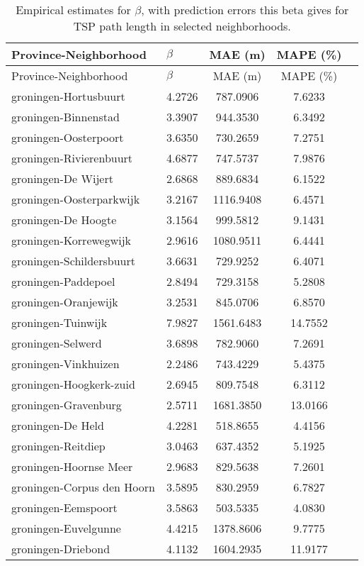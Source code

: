\begin{longtable}{llccc}
\caption{Empirical estimates for $\beta$, with prediction errors this beta gives for TSP path length in selected neighborhoods.} \label{tab:results}\\
\hline
Province-Neighborhood & $\beta$ & MAE (m) & MAPE (\%) \\
\hline
\endfirsthead
\hline
Province-Neighborhood & $\beta$ & MAE (m) & MAPE (\%) \\
\hline
\endhead
groningen-Hortusbuurt & 4.2726 & 787.0906 & 7.6233 \\
groningen-Binnenstad & 3.3907 & 944.3530 & 6.3492 \\
groningen-Oosterpoort & 3.6350 & 730.2659 & 7.2751 \\
groningen-Rivierenbuurt & 4.6877 & 747.5737 & 7.9876 \\
groningen-De Wijert & 2.6868 & 889.6834 & 6.1522 \\
groningen-Oosterparkwijk & 3.2167 & 1116.9408 & 6.4571 \\
groningen-De Hoogte & 3.1564 & 999.5812 & 9.1431 \\
groningen-Korrewegwijk & 2.9616 & 1080.9511 & 6.4441 \\
groningen-Schildersbuurt & 3.6631 & 729.9252 & 6.4071 \\
groningen-Paddepoel & 2.8494 & 729.3158 & 5.2808 \\
groningen-Oranjewijk & 3.2531 & 845.0706 & 6.8570 \\
groningen-Tuinwijk & 7.9827 & 1561.6483 & 14.7552 \\
groningen-Selwerd & 3.6898 & 782.9060 & 7.2691 \\
groningen-Vinkhuizen & 2.2486 & 743.4229 & 5.4375 \\
groningen-Hoogkerk-zuid & 2.6945 & 809.7548 & 6.3112 \\
groningen-Gravenburg & 2.5711 & 1681.3850 & 13.0166 \\
groningen-De Held & 4.2281 & 518.8655 & 4.4156 \\
groningen-Reitdiep & 3.0463 & 637.4352 & 5.1925 \\
groningen-Hoornse Meer & 2.9683 & 829.5638 & 7.2601 \\
groningen-Corpus den Hoorn & 3.5895 & 830.2959 & 6.7827 \\
groningen-Eemspoort & 3.5863 & 503.5335 & 4.0830 \\
groningen-Euvelgunne & 4.4215 & 1378.8606 & 9.7775 \\
groningen-Driebond & 4.1132 & 1604.2935 & 11.9177 \\

\end{longtable}
